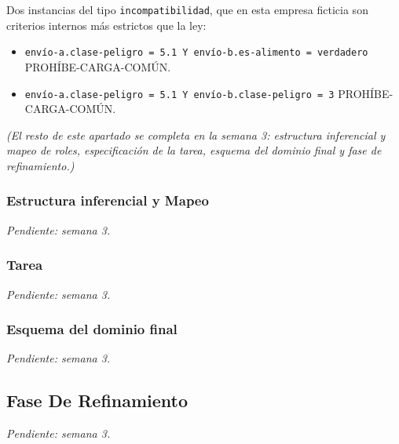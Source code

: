 \documentclass[12pt,a4paper,twoside,spanish]{article}      %
\begin{document}
Dos instancias del tipo \texttt{incompatibilidad}, que en esta empresa
ficticia son criterios internos más estrictos que la ley:
\begin{itemize}
 \item \texttt{envío-a.clase-peligro = 5.1 Y envío-b.es-alimento = verdadero}
 PROHÍBE-CARGA-COMÚN.
 \item \texttt{envío-a.clase-peligro = 5.1 Y envío-b.clase-peligro = 3}
 PROHÍBE-CARGA-COMÚN.
\end{itemize}

\textit{(El resto de este apartado se completa en la semana 3: estructura
inferencial y mapeo de roles, especificación de la tarea, esquema del dominio
final y fase de refinamiento.)}

\subsubsection{Estructura inferencial y Mapeo}

\textit{Pendiente: semana 3.}

\subsubsection{Tarea}

\textit{Pendiente: semana 3.}

\subsubsection{Esquema del dominio final}

\textit{Pendiente: semana 3.}


\subsection{Fase De Refinamiento}

\textit{Pendiente: semana 3.}
\end{document}
